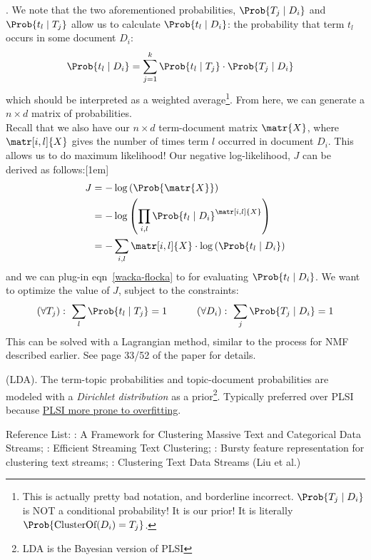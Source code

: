 \documentclass[11pt]{article}
\begin{document}
\myspace
\p {}. We note that the two aforementioned probabilities, $\Prob{T_j \mid D_i}$ and $\Prob{t_l \mid T_j}$ allow us to calculate $\Prob{t_l \mid D_i}$: the probability that term $t_l$ occurs in some document $D_i$:
\begin{align}
	\Prob{t_l \mid D_i} &= \sum_{j = 1}^{k} \Prob{t_l \mid T_j} \cdot \Prob{T_j \mid D_i} \label{wacka-flocka}
\end{align}
which should be interpreted as a weighted average\footnote{This is actually pretty bad notation, and borderline incorrect. $\Prob{T_j \mid D_i}$ is NOT a conditional probability! It is our prior! It is literally $\Prob{\text{ClusterOf}(D_i) = T_j}$.}. From here, we can generate a $n \times d$ matrix of probabilities. \\


\p Recall that we also have our $n \times d$ term-document matrix $\matr{X}$, where $\matr[i, l]{X}$ gives the number of times term $l$ occurred in document $D_i$. This allows us to do maximum likelihood! Our negative log-likelihood, $J$ can be derived as follows:[1em]
\begin{align}
	J &= - \log\left(  \Prob{\matr{X}} \right) \\
	&= - \log\left( \prod_{i, l} \Prob{ t_l \mid D_i   }^{ \matr[i, l]{X} } \right) \\
	&= - \sum_{i, l} \matr[i, l]{X} \cdot \log\left(  \Prob{ t_l \mid D_i   } \right) 
\end{align}
and we can plug-in eqn~\ref{wacka-flocka} to for evaluating $\Prob{ t_l \mid D_i}$. We want to optimize the value of $J$, subject to the constraints:
\begin{align}
	(\forall T_j): ~ \sum_l \Prob{t_l \mid T_j} = 1 
	\qquad\quad 
	(\forall D_i): ~ \sum_j \Prob{T_j \mid D_i} = 1
\end{align}
This can be solved with a Lagrangian method, similar to the process for NMF described earlier. See page 33/52 of the paper for details.

\myspace 
\p {} (LDA). The term-topic probabilities and topic-document probabilities are modeled with a \textit{Dirichlet distribution} as a prior\footnote{LDA is the Bayesian version of PLSI}. Typically preferred over PLSI because \underline{PLSI more prone to overfitting}.

\myspace\myspace{}
\begin{center}
\linespread{0.5}\tiny Reference List: : A Framework for Clustering Massive Text and Categorical Data Streams; \purple{[112]}: Efficient Streaming Text Clustering; : Bursty feature representation
for clustering text streams; : Clustering Text Data Streams (Liu et al.)
\end{center}
\myspace
\end{document}
